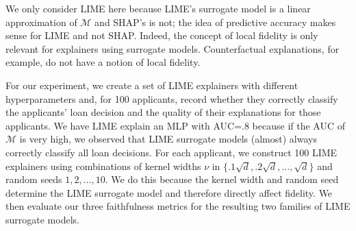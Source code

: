 \documentclass[mnsc,blindrev]{informs3}
\begin{document}
            We only consider LIME here because LIME's surrogate model is a linear approximation of $\mathcal{M}$ and SHAP's is not; the idea of predictive accuracy makes sense for LIME and not SHAP. Indeed, the concept of local fidelity is only relevant for explainers using surrogate models. Counterfactual explanations, for example, do not have a notion of local fidelity. 
            
        
            For our experiment, we create a set of LIME explainers with different hyperparameters and, for 100 applicants, record whether they correctly classify the applicants' loan decision and the quality of their explanations for those applicants. We have LIME explain an MLP with AUC=.8 because if the AUC of $\mathcal{M}$ is very high, we observed that LIME surrogate models (almost) always correctly classify all loan decisions. For each applicant, we construct 100 LIME explainers using combinations of kernel widths $\nu$ in $\{.1\sqrt{d},.2\sqrt{d},\ldots,\sqrt{d}\}$ and random seeds $1,2,\ldots,10$. We do this because the kernel width and random seed determine the LIME surrogate model and therefore directly affect fidelity. We then evaluate our three faithfulness metrics for the resulting two families of LIME surrogate models. %
                    
        
\end{document}
